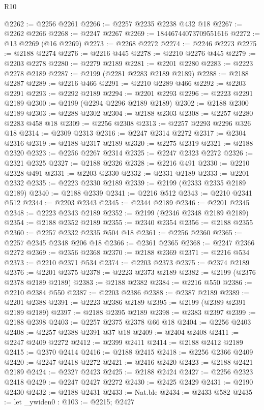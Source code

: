 \begin{lexlean}{R10}
\begin{coremodule}
@2262 := @2256 @2261
@2266 := @2257 @2235 @2238 @432 @18
@2267 := @2262 @2266
@2268 := @2247 @2267
@2269 := 18446744073709551616
@2272 := @13 @2269 (@16 @2269)
@2273 := @2268 @2272
@2274 := @2246 @2273
@2275 := @2188 @2274
@2276 := @2216 @445
@2278 := @2210 @2276 @445
@2279 := @2203 @2278
@2280 := @2279 @2189
@2281 := @2201 @2280
@2283 := @2223 @2278 @2189
@2287 := @2199 (@2281 @2283 @2189 @2189)
@2288 := @2188 @2287
@2289 := @2216 @466
@2291 := @2210 @2289 @466
@2292 := @2203 @2291
@2293 := @2292 @2189
@2294 := @2201 @2293
@2296 := @2223 @2291 @2189
@2300 := @2199 (@2294 @2296 @2189 @2189)
@2302 := @2188 @2300 @2189
@2303 := @2288 @2302
@2304 := @2188 @2303
@2308 := @2257 @2280 @2283 @458 @18
@2309 := @2256 @2308
@2313 := @2257 @2293 @2296 @326 @18
@2314 := @2309 @2313
@2316 := @2247 @2314 @2272
@2317 := @2304 @2316
@2319 := @2188 @2317 @2189
@2320 := @2275 @2319
@2321 := @2188 @2320
@2323 := @2256 @2267 @2314
@2325 := @2247 @2323 @2272
@2326 := @2321 @2325
@2327 := @2188 @2326
@2328 := @2216 @491
@2330 := @2210 @2328 @491
@2331 := @2203 @2330
@2332 := @2331 @2189
@2333 := @2201 @2332
@2335 := @2223 @2330 @2189
@2339 := @2199 (@2333 @2335 @2189 @2189)
@2340 := @2188 @2339
@2341 := @2216 @512
@2343 := @2210 @2341 @512
@2344 := @2203 @2343
@2345 := @2344 @2189
@2346 := @2201 @2345
@2348 := @2223 @2343 @2189
@2352 := @2199 (@2346 @2348 @2189 @2189)
@2354 := @2188 @2352 @2189
@2355 := @2340 @2354
@2356 := @2188 @2355
@2360 := @2257 @2332 @2335 @504 @18
@2361 := @2256 @2360
@2365 := @2257 @2345 @2348 @206 @18
@2366 := @2361 @2365
@2368 := @2247 @2366 @2272
@2369 := @2356 @2368
@2370 := @2188 @2369
@2371 := @2216 @534
@2373 := @2210 @2371 @534
@2374 := @2203 @2373
@2375 := @2374 @2189
@2376 := @2201 @2375
@2378 := @2223 @2373 @2189
@2382 := @2199 (@2376 @2378 @2189 @2189)
@2383 := @2188 @2382
@2384 := @2216 @550
@2386 := @2210 @2384 @550
@2387 := @2203 @2386
@2388 := @2387 @2189
@2389 := @2201 @2388
@2391 := @2223 @2386 @2189
@2395 := @2199 (@2389 @2391 @2189 @2189)
@2397 := @2188 @2395 @2189
@2398 := @2383 @2397
@2399 := @2188 @2398
@2403 := @2257 @2375 @2378 @66 @18
@2404 := @2256 @2403
@2408 := @2257 @2388 @2391 @37 @18
@2409 := @2404 @2408
@2411 := @2247 @2409 @2272
@2412 := @2399 @2411
@2414 := @2188 @2412 @2189
@2415 := @2370 @2414
@2416 := @2188 @2415
@2418 := @2256 @2366 @2409
@2420 := @2247 @2418 @2272
@2421 := @2416 @2420
@2423 := @2188 @2421 @2189
@2424 := @2327 @2423
@2425 := @2188 @2424
@2427 := @2256 @2323 @2418
@2429 := @2247 @2427 @2272
@2430 := @2425 @2429
@2431 := @2190 @2430
@2432 := @2188 @2431
@2433 := Nat.ble
@2434 := @2433 @582
@2435 := let _ywiden0 : @103 := @2215; @2427

\end{coremodule}
\end{lexlean}
